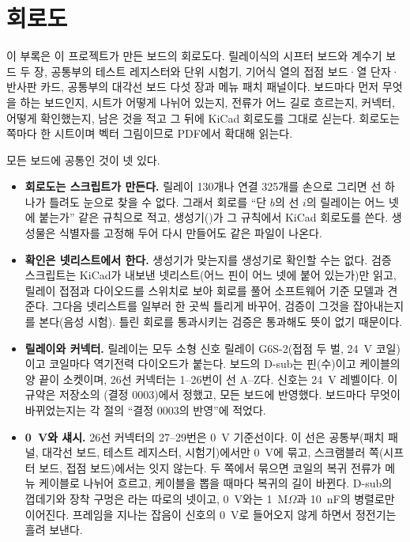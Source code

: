 \chapter{회로도}\label{app:schematics}

이 부록은 이 프로젝트가 만든 보드의 회로도다. 릴레이식의 시프터 보드와 계수기 보드 두 장, 공통부의 테스트
레지스터와 단위 시험기, 기어식 열의 접점 보드·열 단자·반사판 카드, 공통부의 대각선 보드 다섯 장과 메뉴 패치
패널이다. 보드마다 먼저 무엇을 하는 보드인지, 시트가 어떻게 나뉘어 있는지, 전류가 어느 길로 흐르는지, 커넥터,
어떻게 확인했는지, 남은 것을 적고 그 뒤에 KiCad 회로도를 그대로 싣는다. 회로도는 쪽마다 한 시트이며 벡터
그림이므로 PDF에서 확대해 읽는다.

모든 보드에 공통인 것이 넷 있다.

\begin{itemize}
\item \textbf{회로도는 스크립트가 만든다.} 릴레이 130개나 연결 325개를 손으로 그리면 선 하나가 틀려도 눈으로 찾을 수
없다. 그래서 회로를 ``단 $b$의 선 $i$의 릴레이는 어느 넷에 붙는가'' 같은 규칙으로 적고, 생성기()가 그
규칙에서 KiCad 회로도를 쓴다. 생성물은 식별자를 고정해 두어 다시 만들어도 같은 파일이 나온다.
\item \textbf{확인은 넷리스트에서 한다.} 생성기가 맞는지를 생성기로 확인할 수는 없다. 검증 스크립트는 KiCad가
내보낸 넷리스트(어느 핀이 어느 넷에 붙어 있는가)만 읽고, 릴레이 접점과 다이오드를 스위치로 보아 회로를 풀어
소프트웨어 기준 모델과 견준다. 그다음 넷리스트를 일부러 한 곳씩 틀리게 바꾸어, 검증이 그것을 잡아내는지를
본다(음성 시험). 틀린 회로를 통과시키는 검증은 통과해도 뜻이 없기 때문이다.
\item \textbf{릴레이와 커넥터.} 릴레이는 모두 소형 신호 릴레이 G6S-2(접점 두 벌, 24~V 코일)이고 코일마다
역기전력 다이오드가 붙는다. 보드의 D-sub는 핀(수)이고 케이블의 양 끝이 소켓이며, 26선 커넥터는 1--26번이 선
A--Z다. 신호는 24~V 레벨이다. 이 규약은 저장소의 (결정 0003)에서 정했고,
모든 보드에 반영했다. 보드마다 무엇이 바뀌었는지는 각 절의 ``결정 0003의 반영''에 적었다.
\item \textbf{0~V와 섀시.} 26선 커넥터의 27--29번은 0~V 기준선이다. 이 선은 공통부(패치 패널, 대각선 보드,
테스트 레지스터, 시험기)에서만 0~V에 묶고, 스크램블러 쪽(시프터 보드, 접점 보드)에서는 잇지 않는다. 두 쪽에서
묶으면 코일의 복귀 전류가 메뉴 케이블로 나뉘어 흐르고, 케이블을 뽑을 때마다 복귀의 길이 바뀐다. D-sub의
껍데기와 장착 구멍은 라는 따로의 넷이고, 0~V와는 1~M$\Omega$과 10~nF의 병렬로만 이어진다. 프레임을
지나는 잡음이 신호의 0~V로 들어오지 않게 하면서 정전기는 흘려 보낸다.
\end{itemize}

